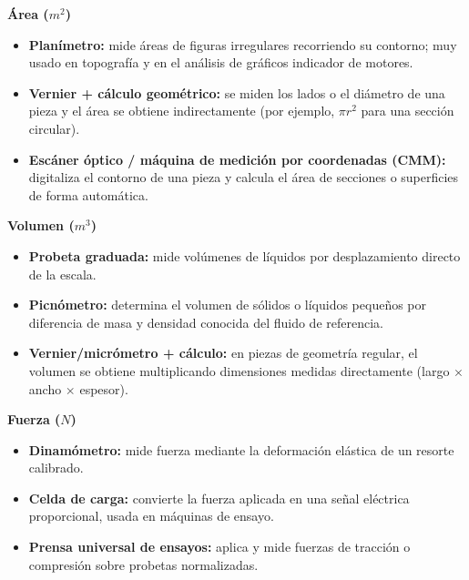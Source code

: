 \documentclass[12pt,a4paper]{article}
\begin{document}
\textbf{Área ($m^2$)}

\begin{itemize}
	\item \textbf{Planímetro:} mide áreas de figuras irregulares recorriendo su
	      contorno; muy usado en topografía y en el análisis de gráficos indicador
	      de motores.\\[-10pt]
	\item \textbf{Vernier + cálculo geométrico:} se miden los lados o el diámetro
	      de una pieza y el área se obtiene indirectamente (por ejemplo, $\pi r^2$
	      para una sección circular).\\[-10pt]
	\item \textbf{Escáner óptico / máquina de medición por coordenadas (CMM):}
	      digitaliza el contorno de una pieza y calcula el área de secciones o
	      superficies de forma automática.
\end{itemize}

\textbf{Volumen ($m^3$)}

\begin{itemize}
	\item \textbf{Probeta graduada:} mide volúmenes de líquidos por desplazamiento
	      directo de la escala.\\[-10pt]
	\item \textbf{Picnómetro:} determina el volumen de sólidos o líquidos pequeños
	      por diferencia de masa y densidad conocida del fluido de
	      referencia.\\[-10pt]
	\item \textbf{Vernier/micrómetro + cálculo:} en piezas de geometría regular,
	      el volumen se obtiene multiplicando dimensiones medidas directamente
	      (largo $\times$ ancho $\times$ espesor).
\end{itemize}

\textbf{Fuerza ($N$)}

\begin{itemize}
	\item \textbf{Dinamómetro:} mide fuerza mediante la deformación elástica de un
	      resorte calibrado.\\[-10pt]
	\item \textbf{Celda de carga:} convierte la fuerza aplicada en una señal
	      eléctrica proporcional, usada en máquinas de ensayo.\\[-10pt]
	\item \textbf{Prensa universal de ensayos:} aplica y mide fuerzas de tracción
	      o compresión sobre probetas normalizadas.
\end{itemize}
\end{document}
